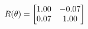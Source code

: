 \documentclass[preview]{standalone}
\begin{document}
\begin{align*}
\special{dvisvgm:raw <g id='unique000'>}R(\theta) = \begin{bmatrix}1.00 & -0.07\\0.07 & 1.00\end{bmatrix}\special{dvisvgm:raw </g>}
\end{align*}
\end{document}
